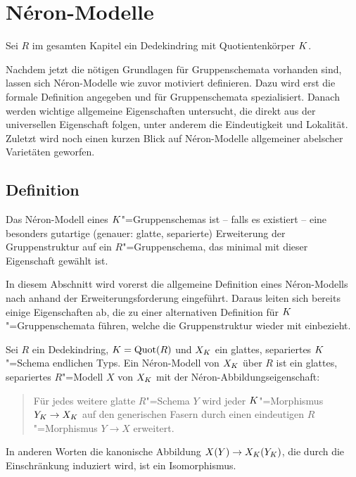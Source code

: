 \chapter{Néron-Modelle}\label{chap:neronmodelle}
Sei $R$ im gesamten Kapitel ein Dedekindring mit Quotientenkörper
$K$.

Nachdem jetzt die nötigen Grundlagen für Gruppenschemata vorhanden
sind, lassen sich Néron-Modelle wie zuvor motiviert definieren.
Dazu wird erst die formale Definition angegeben und für
Gruppenschemata spezialisiert. Danach werden wichtige allgemeine
Eigenschaften untersucht, die direkt aus der universellen Eigenschaft
folgen, unter anderem die Eindeutigkeit und Lokalität.
Zuletzt wird noch einen kurzen Blick auf Néron-Modelle
allgemeiner abelscher Varietäten geworfen.

\section{Definition}
Das Néron-Modell eines $K$"=Gruppenschemas ist – falls es existiert –
eine besonders gutartige (genauer: glatte, separierte) Erweiterung der
Gruppenstruktur auf ein $R$"=Gruppenschema, das
minimal mit dieser Eigenschaft gewählt ist.

In diesem Abschnitt wird vorerst die allgemeine Definition eines
Néron-Modells nach \cite[Definition~1.2/1]{neron} anhand der
Erweiterungsforderung eingeführt. Daraus leiten sich bereits einige
Eigenschaften ab, die zu einer alternativen Definition für
$K$"=Gruppenschemata führen, welche die Gruppenstruktur wieder mit
einbezieht.

\begin{Definition}
  Sei $R$ ein Dedekindring, $K=\operatorname{Quot}(R)$ und
  $X_{K}$ ein glattes, separiertes $K$"=Schema endlichen Typs.
  Ein Néron-Modell von $X_{K}$ über $R$ ist ein glattes, separiertes
  $R$"=Modell $X$ von $X_{K}$ mit der Néron-Abbildungseigenschaft:
  \begin{quote}
    Für jedes weitere glatte $R$"=Schema $Y$ wird jeder
    $K$"=Morphismus $Y_{K}\to X_{K}$ auf den generischen Fasern durch
    einen eindeutigen $R$"=Morphismus $Y\to X$ erweitert.
  \end{quote}
  In anderen Worten die kanonische Abbildung $X(Y)\to X_{K}(Y_{K})$, die
  durch die Einschränkung induziert wird, ist ein Isomorphismus.
\end{Definition}

